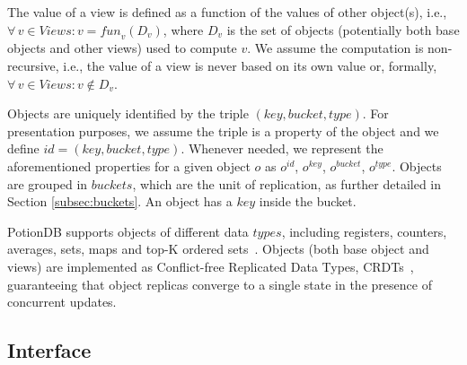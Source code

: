 \documentclass[sigconf, nonacm]{acmart}
\begin{document}
The value of a view is defined as a function of the values of other object(s), i.e., 
$\forall\, v \in \mathit{Views} : v = \mathit{fun}_v(D_v)$, 
where $D_v$ is the set of objects (potentially both base objects and other views) used to compute $v$.
We assume the computation is non-recursive, i.e., the value of a view is never based on its own value or, formally, 
$\forall\, v \in \mathit{Views} : v \notin D_v$.

Objects are uniquely identified by the triple $\mathit{(key, bucket, type)}$.
For presentation purposes, we assume the triple is a property of the object and we define $\mathit{id} = \mathit{(key, bucket, type)}$.
Whenever needed, we represent the aforementioned properties for a given object $o$ as
$o^{\mathit{id}}$, $o^{\mathit{key}}$, $o^{\mathit{bucket}}$, $o^{\mathit{type}}$.
Objects are grouped in $\mathit{buckets}$, which are the unit of replication, as further
detailed in Section \ref{subsec:buckets}. An object has a $\mathit{key}$ inside the bucket.

PotionDB supports objects of different data $\mathit{types}$, including registers, counters, averages, sets, maps
and top-K ordered sets~\cite{Cabrita17Nonuniform}.
Objects (both base object and views) are implemented as Conflict-free Replicated 
Data Types, CRDTs~\cite{crdt}, guaranteeing that object replicas converge to a single state
in the presence of concurrent updates.

\subsection{Interface}
\label{subsec:interface}
\end{document}
